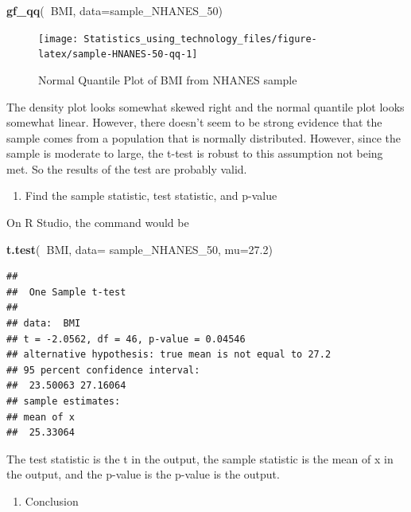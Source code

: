 \documentclass[
]{book}
\newenvironment{Shaded}{\begin{snugshade}}{\end{snugshade}}
\newcommand{\DataTypeTok}[1]{\textcolor[rgb]{0.13,0.29,0.53}{#1}}
\newcommand{\DecValTok}[1]{\textcolor[rgb]{0.00,0.00,0.81}{#1}}
\newcommand{\FloatTok}[1]{\textcolor[rgb]{0.00,0.00,0.81}{#1}}
\newcommand{\KeywordTok}[1]{\textcolor[rgb]{0.13,0.29,0.53}{\textbf{#1}}}
\newcommand{\NormalTok}[1]{#1}
\newcommand{\OperatorTok}[1]{\textcolor[rgb]{0.81,0.36,0.00}{\textbf{#1}}}
\providecommand{\tightlist}{%
  \setlength{\itemsep}{0pt}\setlength{\parskip}{0pt}}
\begin{document}
\begin{Shaded}
\begin{Highlighting}[]
\KeywordTok{gf_qq}\NormalTok{(}\OperatorTok{~}\NormalTok{BMI, }\DataTypeTok{data=}\NormalTok{sample_NHANES_}\DecValTok{50}\NormalTok{)}
\end{Highlighting}
\end{Shaded}

\begin{figure}
\texttt{[image: Statistics\_using\_technology\_files/figure-latex/sample-HNANES-50-qq-1]} \caption{Normal Quantile Plot of BMI from NHANES sample}\label{fig:sample-HNANES-50-qq}
\end{figure}

The density plot looks somewhat skewed right and the normal quantile plot looks somewhat linear. However, there doesn't seem to be strong evidence that the sample comes from a population that is normally distributed. However, since the sample is moderate to large, the t-test is robust to this assumption not being met. So the results of the test are probably valid.

\begin{enumerate}
\def\labelenumi{\arabic{enumi}.}
\setcounter{enumi}{3}
\tightlist
\item
  Find the sample statistic, test statistic, and p-value
\end{enumerate}

On R Studio, the command would be

\begin{Shaded}
\begin{Highlighting}[]
\KeywordTok{t.test}\NormalTok{(}\OperatorTok{~}\NormalTok{BMI, }\DataTypeTok{data=}\NormalTok{ sample_NHANES_}\DecValTok{50}\NormalTok{, }\DataTypeTok{mu=}\FloatTok{27.2}\NormalTok{)}
\end{Highlighting}
\end{Shaded}

\begin{verbatim}
## 
##  One Sample t-test
## 
## data:  BMI
## t = -2.0562, df = 46, p-value = 0.04546
## alternative hypothesis: true mean is not equal to 27.2
## 95 percent confidence interval:
##  23.50063 27.16064
## sample estimates:
## mean of x 
##  25.33064
\end{verbatim}

The test statistic is the t in the output, the sample statistic is the mean of x in the output, and the p-value is the p-value is the output.

\begin{enumerate}
\def\labelenumi{\arabic{enumi}.}
\setcounter{enumi}{4}
\tightlist
\item
  Conclusion
\end{enumerate}
\end{document}
